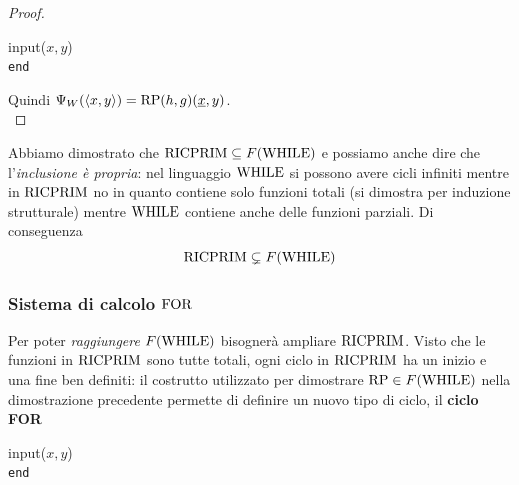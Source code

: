 \begin{proof}
	\begin{center}
		\begin{minipage}{0.85\textwidth}
			\begin{tcolorbox}[colback=white,sharp corners,boxrule=.3mm]
				\begin{algorithm}[H]
					\SetAlgoNoEnd
					input($x,y$) \\
					\texttt{end}
				\end{algorithm}
			\end{tcolorbox}
		\end{minipage}
	\end{center}
	
	Quindi $\Psi_W (\langle x,y \rangle) = \text{RP} (h,g) (\underline{x}, y)$.\\
\end{proof}

Abbiamo dimostrato che $\text{RICPRIM} \subseteq F(\text{WHILE})$ e possiamo anche dire che l'\textit{inclusione è propria}: nel linguaggio $\text{WHILE}$ si possono avere cicli infiniti mentre in $\text{RICPRIM}$ no in quanto contiene solo funzioni totali (si dimostra per induzione strutturale) mentre $\text{WHILE}$ contiene anche delle funzioni parziali. Di conseguenza
$$ \text{RICPRIM} \subsetneq F(\text{WHILE}) $$

\subsubsection{Sistema di calcolo $\text{FOR}$}

Per poter \textit{raggiungere} $F(\text{WHILE})$ bisognerà ampliare $\text{RICPRIM}$. Visto che le funzioni in $\text{RICPRIM}$ sono tutte totali, ogni ciclo in $\text{RICPRIM}$ ha un inizio e una fine ben definiti: il costrutto utilizzato per dimostrare $\text{RP} \in F(\text{WHILE})$ nella dimostrazione precedente permette di definire un nuovo tipo di ciclo, il \textbf{ciclo FOR}
\begin{center}
	\begin{minipage}{.85\textwidth}
		\begin{tcolorbox}[colback=white,sharp corners,boxrule=.3mm]
			\begin{algorithm}[H]
				\SetAlgoNoEnd
				input($x,y$) \\
				\texttt{end}
			\end{algorithm}
		\end{tcolorbox} 
	\end{minipage}
\end{center}

